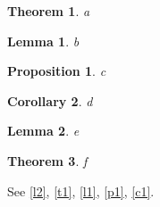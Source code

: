 \documentclass{article}
\newtheorem{theorem}{Theorem}
\newtheorem{lemma}[lemma]{Lemma}
\newtheorem{prop}[prop]{Proposition}
\newtheorem{cor}[theorem]{Corollary}
\begin{document}
\begin{theorem}\label{t1}a\end{theorem}
\begin{lemma}\label{l1}b\end{lemma}
\begin{prop}\label{p1}c\end{prop}
\begin{cor}\label{c1}d\end{cor}
\setcounter{lemma}{7}\begin{lemma}\label{l2}e\end{lemma}\begin{theorem}f\end{theorem}
See \autoref{l2}, \autoref{t1}, \autoref{l1}, \autoref{p1}, \autoref{c1}.
\end{document}
